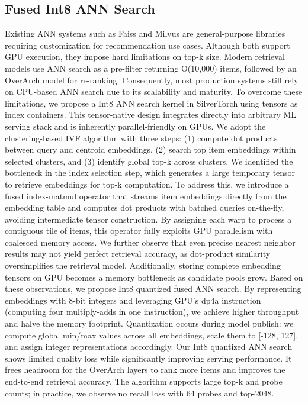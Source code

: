 \subsection{Fused Int8 ANN Search}
Existing ANN systems such as Faiss and Milvus are general-purpose libraries requiring customization for recommendation use cases. Although both support GPU execution, they impose hard limitations on top-k size. Modern retrieval models use ANN search as a pre-filter returning O(10,000) items, followed by an OverArch model for re-ranking. Consequently, most production systems still rely on CPU-based ANN search due to its scalability and maturity.
To overcome these limitations, we propose a Int8 ANN search kernel in SilverTorch using tensors as index containers. This tensor-native design integrates directly into arbitrary ML serving stack and is inherently parallel-friendly on GPUs. We adopt the clustering-based IVF algorithm with three steps: (1) compute dot products between query and centroid embeddings, (2) search top item embeddings within selected clusters, and (3) identify global top-k across clusters.
We identified the bottleneck in the index selection step, which generates a large temporary tensor to retrieve embeddings for top-k computation. To address this, we introduce a fused index-matmul operator that streams item embeddings directly from the embedding table and computes dot products with batched queries on-the-fly, avoiding intermediate tensor construction. By assigning each warp to process a contiguous tile of items, this operator fully exploits GPU parallelism with coalesced memory access.
We further observe that even precise nearest neighbor results may not yield perfect retrieval accuracy, as dot-product similarity oversimplifies the retrieval model. Additionally, storing complete embedding tensors on GPU becomes a memory bottleneck as candidate pools grow. Based on these observations, we propose Int8 quantized fused ANN search. By representing embeddings with 8-bit integers and leveraging GPU's dp4a instruction (computing four multiply-adds in one instruction), we achieve higher throughput and halve the memory footprint. Quantization occurs during model publish: we compute global min/max values across all embeddings, scale them to [-128, 127], and assign integer representations accordingly.
Our Int8 quantized ANN search shows limited quality loss while significantly improving serving performance. It frees headroom for the OverArch layers to rank more items and improves the end-to-end retrieval accuracy. The algorithm supports large top-k and probe counts; in practice, we observe no recall loss with 64 probes and top-2048.
